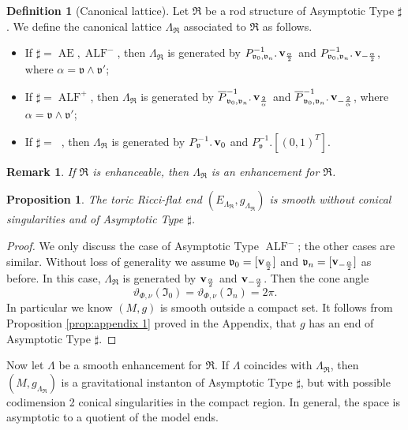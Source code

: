 \documentclass[a4paper,11pt]{amsart}
\newtheorem{proposition}[theorem]{Proposition}
\newtheorem{remark}[theorem]{Remark}
\theoremstyle{definition}
\newtheorem{definition}[theorem]{Definition}
\numberwithin{equation}{section}
\newcommand{\mv} {\mathfrak v}
\newcommand{\mI} {\mathfrak I}
\newcommand{\mR} {\mathfrak R}
\DeclareMathOperator{\bv}{{\bf v}}
\DeclareMathOperator{\Ae}{AE}
\DeclareMathOperator{\ALF}{ALF}
\DeclareMathOperator{\AFa}{AF_\beta}
\begin{document}
\begin{definition}[Canonical lattice]\label{def:canonical enhancement}
    Let $\mR$ be a rod structure of Asymptotic Type $\sharp$. We define the canonical lattice $\Lambda_{\mR}$
 associated to $\mR$ as follows. 
 \begin{itemize}
     \item If $\sharp=\Ae, \ALF^{-}$, then $\Lambda_{\mR}$ is generated by $P_{\mv_0, \mv_n}^{-1}.\bv_{\frac{\alpha}{2}}$ and $P_{\mv_0, \mv_n}^{-1}.\bv_{-\frac{\alpha}{2}}$, where $\alpha=\mv\wedge\mv'$;
     \item If $\sharp=\ALF^+$, then $\Lambda_{\mR}$ is generated by $\overline P_{\mv_0, \mv_n}^{-1}.\bv_{\frac{2}\alpha}$ and $\overline P_{\mv_0, \mv_n}^{-1}.\bv_{-\frac{2}{\alpha}}$, where $\alpha=\mv\wedge\mv'$;
     \item If $\sharp=\AFa$, then $\Lambda_{\mR}$ is generated by $P_{\mv}^{-1}. \bv_0$ and $P_{\mv}^{-1}. [(0, 1)^T]$. \end{itemize}
 \end{definition}
 \begin{remark}
     If $\mR$ is enhanceable, then $\Lambda_{\mR}$ is an enhancement for $\mR$. \end{remark}

\begin{proposition}\label{prop:smooth end lattice}
    The toric  Ricci-flat end $(E_{\Lambda_\mR},g_{\Lambda_{\mR}})$ is smooth without conical singularities and of  Asymptotic Type  $\sharp$.
\end{proposition}
\begin{proof}
   We only discuss the case of Asymptotic Type $\ALF^-$; the other cases are similar. Without loss of generality we assume $\mv_0=[\bv_{\frac{\alpha}{2}}]$ and $\mv_n=[\bv_{-\frac{\alpha}{2}}]$ as before. In this case,  $\Lambda_{\mR}$ is generated by $\bv_{\frac{\alpha}{2}}$ and $\bv_{-\frac{\alpha}{2}}$.
    Then the cone angle 
        $$\vartheta_{\Phi, \nu}(\mI_0)=\vartheta_{\Phi, \nu}(\mI_n)=2\pi.$$
    In particular we know $(M, g)$ is smooth outside a compact set. It follows from Proposition \ref{prop:appendix 1} proved in the Appendix, that $g$ has an end of  Asymptotic Type  $\sharp$.
\end{proof}



Now let $\Lambda$ be a smooth enhancement for $\mR$. If $\Lambda$ coincides with $\Lambda_{\mR}$, then $(M, g_{\Lambda_{\mR}})$ is a gravitational instanton of  Asymptotic Type  $\sharp$, but with possible  codimension 2 conical singularities in the compact region. In general, the space is asymptotic to a quotient of the model ends. 
\end{document}
